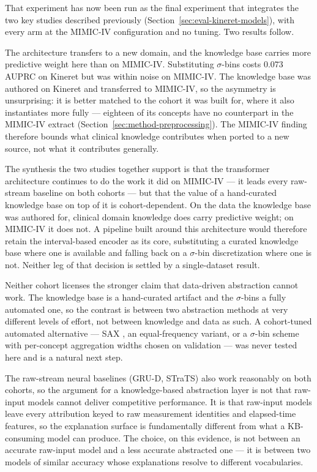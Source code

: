 That experiment has now been run as the final experiment that integrates the two key studies described previously (Section~\ref{sec:eval-kineret-models}), with every arm at the MIMIC-IV configuration and no tuning. Two results follow.

The architecture transfers to a new domain, and the knowledge base carries more predictive weight here than on MIMIC-IV. Substituting $\sigma$-bins costs $0.073$ AUPRC on Kineret but was within noise on MIMIC-IV. The knowledge base was authored on Kineret and transferred to MIMIC-IV, so the asymmetry is unsurprising: it is better matched to the cohort it was built for, where it also instantiates more fully --- eighteen of its concepts have no counterpart in the MIMIC-IV extract (Section~\ref{sec:method-preprocessing}). The MIMIC-IV finding therefore bounds what clinical knowledge contributes when ported to a new source, not what it contributes generally.

The synthesis the two studies together support is that the transformer architecture continues to do the work it did on MIMIC-IV --- it leads every raw-stream baseline on both cohorts --- but that the value of a hand-curated knowledge base on top of it is cohort-dependent. On the data the knowledge base was authored for, clinical domain knowledge does carry predictive weight; on MIMIC-IV it does not. A pipeline built around this architecture would therefore retain the interval-based encoder as its core, substituting a curated knowledge base where one is available and falling back on a $\sigma$-bin discretization where one is not. Neither leg of that decision is settled by a single-dataset result.

Neither cohort licenses the stronger claim that data-driven abstraction cannot work. The knowledge base is a hand-curated artifact and the $\sigma$-bins a fully automated one, so the contrast is between two abstraction methods at very different levels of effort, not between knowledge and data as such. A cohort-tuned automated alternative --- SAX \citep{lin2003symbolic}, an equal-frequency variant, or a $\sigma$-bin scheme with per-concept aggregation widths chosen on validation --- was never tested here and is a natural next step.

The raw-stream neural baselines (GRU-D, STraTS) also work reasonably on both cohorts, so the argument for a knowledge-based abstraction layer is not that raw-input models cannot deliver competitive performance. It is that raw-input models leave every attribution keyed to raw measurement identities and elapsed-time features, so the explanation surface is fundamentally different from what a KB-consuming model can produce. The choice, on this evidence, is not between an accurate raw-input model and a less accurate abstracted one --- it is between two models of similar accuracy whose explanations resolve to different vocabularies.

